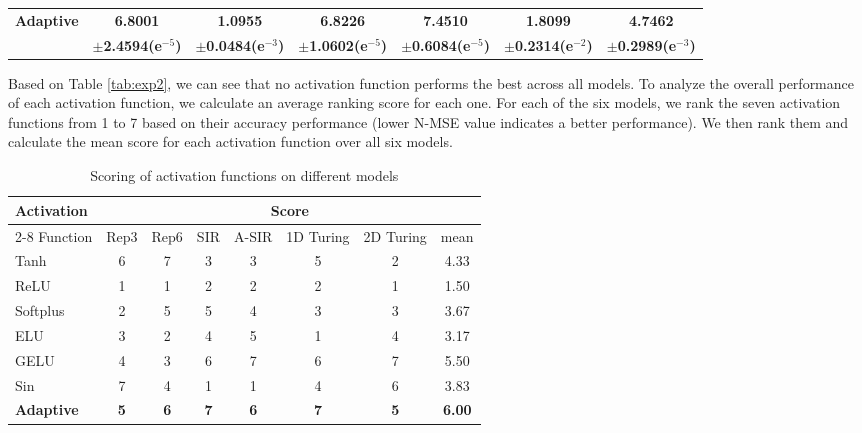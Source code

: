 \begin{table*}[!htb]
\begin{tabular}{ l cccccc }
 \multirow{2}{*}{\textbf{Adaptive}} & \textbf{6.8001} & \textbf{1.0955} & \textbf{6.8226} & \textbf{7.4510} & \textbf{1.8099} & \textbf{4.7462} \\
& \textbf{$\pm$2.4594(e$^{-5}$)} & \textbf{$\pm$0.0484(e$^{-3}$)} & \textbf{$\pm$1.0602(e$^{-5}$)} & \textbf{$\pm$0.6084(e$^{-5}$)} & \textbf{$\pm$0.2314(e$^{-2}$)} & \textbf{$\pm$0.2989(e$^{-3}$)} \\
 
\bottomrule
\end{tabular}%
\end{table*}

Based on Table \ref{tab:exp2}, we can see that no activation function performs the best across all models. To analyze the overall performance of each activation function, we calculate an average ranking score for each one. For each of the six models, we rank the seven activation functions from 1 to 7 based on their accuracy performance (lower N-MSE value indicates a better performance). We then rank them and calculate the mean  score for each activation function over all six models.

\begin{table*}[!htb]
\centering
\small
\caption[Scoring of activation functions on different models] {Scoring of activation functions on different models}
\label{tab:exp2-2}
\begin{tabular}{ l cccccc | c } 
\toprule
\multirow{2}{*}{Activation} & 
\multicolumn{7}{c}{Score} \\
\cmidrule(l){2-8} 
Function & Rep3 & Rep6 &  SIR & A-SIR & 1D Turing & 2D Turing & mean \\
\midrule 
\midrule 

Tanh & 6 & 7 & 3 & 3 & 5 & 2 & 4.33 \\
ReLU & 1 & 1 & 2 & 2 & 2 & 1 & 1.50 \\
Softplus & 2 & 5 & 5 & 4 & 3 & 3 & 3.67 \\
ELU & 3 & 2 & 4 & 5 & 1 & 4 & 3.17 \\
GELU & 4 & 3 & 6 & 7 & 6 & 7 & 5.50 \\
Sin & 7 & 4 & 1 & 1 & 4 & 6 & 3.83 \\
\textbf{Adaptive} & \textbf{5} & \textbf{6} & \textbf{7} & \textbf{6} & \textbf{7} & \textbf{5} & \textbf{6.00} \\  

\bottomrule
\end{tabular}%
\end{table*}

